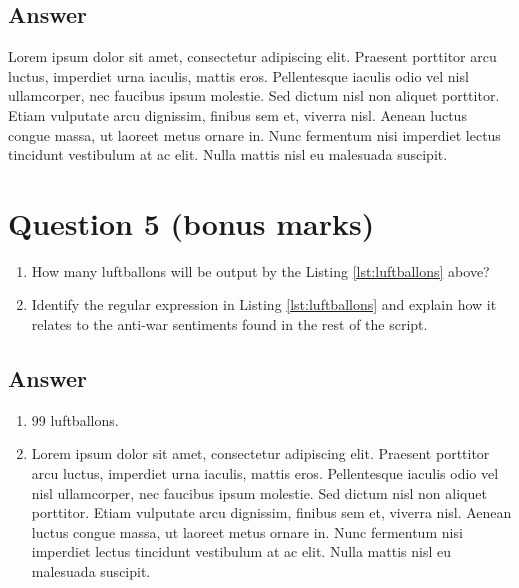 \documentclass[12pt]{fphw}
\begin{document}

\subsection*{Answer}

Lorem ipsum dolor sit amet, consectetur adipiscing elit. Praesent porttitor arcu luctus, imperdiet urna iaculis, mattis eros. Pellentesque iaculis odio vel nisl ullamcorper, nec faucibus ipsum molestie. Sed dictum nisl non aliquet porttitor. Etiam vulputate arcu dignissim, finibus sem et, viverra nisl. Aenean luctus congue massa, ut laoreet metus ornare in. Nunc fermentum nisi imperdiet lectus tincidunt vestibulum at ac elit. Nulla mattis nisl eu malesuada suscipit.


\section*{Question 5 (bonus marks)}

\begin{problem}
	
	
	\begin{enumerate}
		\item How many luftballons will be output by the Listing \ref{lst:luftballons} above?
		\item Identify the regular expression in Listing \ref{lst:luftballons} and explain how it relates to the anti-war sentiments found in the rest of the script.
	\end{enumerate}

\end{problem}


\subsection*{Answer}

\begin{enumerate}
	\item 99 luftballons.
	\item Lorem ipsum dolor sit amet, consectetur adipiscing elit. Praesent porttitor arcu luctus, imperdiet urna iaculis, mattis eros. Pellentesque iaculis odio vel nisl ullamcorper, nec faucibus ipsum molestie. Sed dictum nisl non aliquet porttitor. Etiam vulputate arcu dignissim, finibus sem et, viverra nisl. Aenean luctus congue massa, ut laoreet metus ornare in. Nunc fermentum nisi imperdiet lectus tincidunt vestibulum at ac elit. Nulla mattis nisl eu malesuada suscipit.
\end{enumerate}

\end{document}

